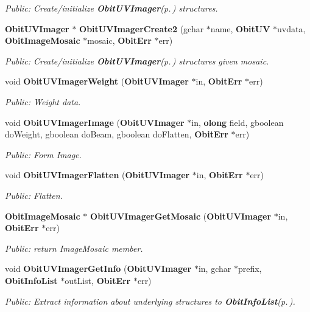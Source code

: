 \begin{CompactItemize}
\begin{CompactList}\small\item\em Public: Create/initialize {\bf Obit\-UVImager}{\rm (p.\,\pageref{structObitUVImager})} structures. \item\end{CompactList}\item 
{\bf Obit\-UVImager} $\ast$ {\bf Obit\-UVImager\-Create2} (gchar $\ast$name, {\bf Obit\-UV} $\ast$uvdata, {\bf Obit\-Image\-Mosaic} $\ast$mosaic, {\bf Obit\-Err} $\ast$err)
\begin{CompactList}\small\item\em Public: Create/initialize {\bf Obit\-UVImager}{\rm (p.\,\pageref{structObitUVImager})} structures given mosaic. \item\end{CompactList}\item 
void {\bf Obit\-UVImager\-Weight} ({\bf Obit\-UVImager} $\ast$in, {\bf Obit\-Err} $\ast$err)
\begin{CompactList}\small\item\em Public: Weight data. \item\end{CompactList}\item 
void {\bf Obit\-UVImager\-Image} ({\bf Obit\-UVImager} $\ast$in, {\bf olong} field, gboolean do\-Weight, gboolean do\-Beam, gboolean do\-Flatten, {\bf Obit\-Err} $\ast$err)
\begin{CompactList}\small\item\em Public: Form Image. \item\end{CompactList}\item 
void {\bf Obit\-UVImager\-Flatten} ({\bf Obit\-UVImager} $\ast$in, {\bf Obit\-Err} $\ast$err)
\begin{CompactList}\small\item\em Public: Flatten. \item\end{CompactList}\item 
{\bf Obit\-Image\-Mosaic} $\ast$ {\bf Obit\-UVImager\-Get\-Mosaic} ({\bf Obit\-UVImager} $\ast$in, {\bf Obit\-Err} $\ast$err)
\begin{CompactList}\small\item\em Public: return Image\-Mosaic member. \item\end{CompactList}\item 
void {\bf Obit\-UVImager\-Get\-Info} ({\bf Obit\-UVImager} $\ast$in, gchar $\ast$prefix, {\bf Obit\-Info\-List} $\ast$out\-List, {\bf Obit\-Err} $\ast$err)
\begin{CompactList}\small\item\em Public: Extract information about underlying structures to {\bf Obit\-Info\-List}{\rm (p.\,\pageref{structObitInfoList})}. \item\end{CompactList}\end{CompactItemize}


